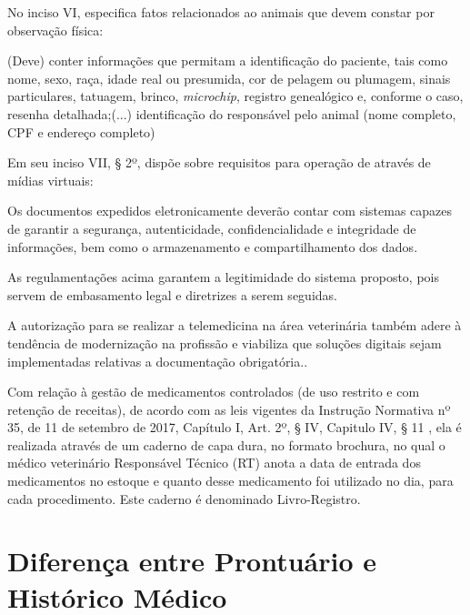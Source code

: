 \documentclass[
    12pt,               %
    openright,          %
    oneside,
    a4paper,            %
    BIBLATEX,           %
    TODO,               %
    english,            %
    brazil              %
    ]{ifsp-spo-inf-ctds}
\begin{document}
            No inciso VI, especifica fatos relacionados ao animais que devem constar por observação física:
        
        \begin{citacao}
            
            (Deve) conter informações que permitam a identificação do paciente, tais como nome, sexo, raça, idade real ou presumida, cor de pelagem ou plumagem, sinais particulares, tatuagem, brinco, \emph{microchip}, registro genealógico e, conforme o caso, resenha detalhada;(...) identificação do responsável pelo animal (nome completo, CPF e endereço completo)
        \end{citacao}

        Em seu inciso VII, § 2º, dispõe sobre requisitos para operação de através de mídias virtuais: 
    
        \begin{citacao}
            Os documentos expedidos eletronicamente deverão contar com sistemas capazes de garantir a segurança, autenticidade, confidencialidade e integridade de informações, bem como o armazenamento e compartilhamento dos dados.
        \end{citacao}

           As regulamentações acima garantem a legitimidade do sistema proposto, pois servem de embasamento legal e diretrizes a serem seguidas.
        
        A autorização para se realizar a telemedicina na área veterinária também adere à tendência de modernização na profissão e viabiliza que soluções digitais sejam implementadas relativas a documentação obrigatória..
        
        Com relação à gestão de medicamentos controlados (de uso restrito e com retenção de receitas), de acordo com as leis vigentes da Instrução Normativa nº 35, de 11 de setembro de 2017, Capítulo I, Art. 2º, § IV, Capitulo IV, § 11  , ela é realizada através de um caderno de capa dura, no formato brochura, no qual o médico veterinário Responsável Técnico (RT) anota a data de entrada dos medicamentos no estoque e quanto desse medicamento foi utilizado no dia, para cada procedimento. Este caderno é denominado Livro-Registro.

    \section{Diferença entre Prontuário e Histórico Médico }
\end{document}
